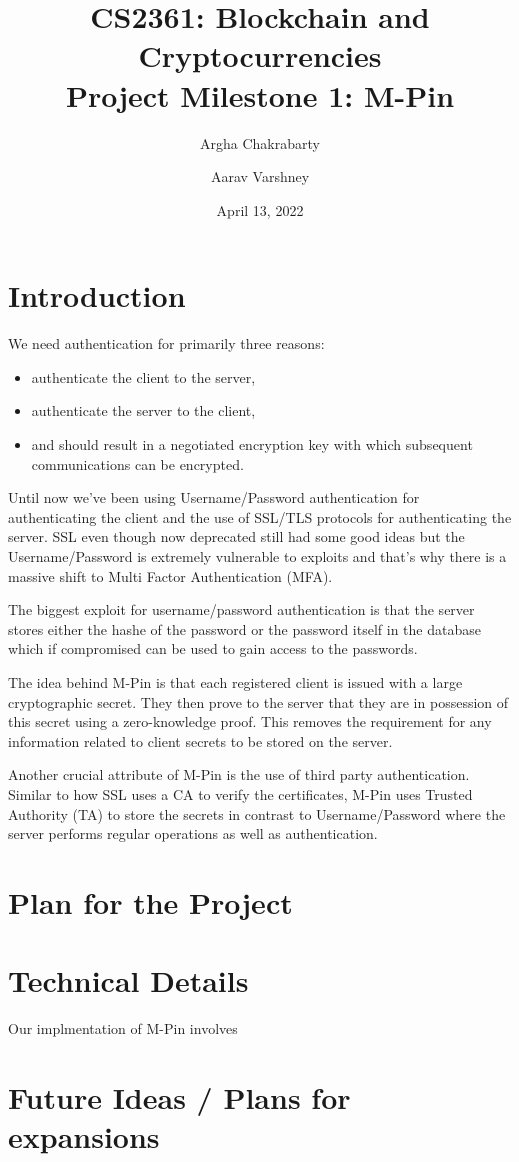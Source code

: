 \documentclass[]{article}   %
\begin{document}
\title{CS2361: Blockchain and Cryptocurrencies\\ Project Milestone 1: M-Pin}   %
\author{Argha Chakrabarty \and Aarav Varshney}         %
\date{April 13, 2022}    %
\maketitle

\section*{Introduction}
We need authentication for primarily three reasons:
\begin{itemize}
    \item authenticate the client to the server,
    \item authenticate the server to the client, 
    \item and should result in a negotiated encryption key with which subsequent communications can be encrypted.
\end{itemize}
Until now we've been using Username/Password authentication for authenticating the client and the use of SSL/TLS protocols for authenticating the server. SSL even though now deprecated still had some good ideas but the Username/Password is extremely vulnerable to exploits and that's why there is a massive shift to Multi Factor Authentication (MFA). 

The biggest exploit for username/password authentication is that the server stores either the hashe of the password or the password itself in the database which if compromised can be used to gain access to the passwords. 

The idea behind M-Pin is that each registered client is issued with a large cryptographic secret. They then prove to the server that they are in possession of this secret using a zero-knowledge proof. This removes the requirement for any information related to client secrets to be stored on the server. 

Another crucial attribute of M-Pin is the use of third party authentication. Similar to how SSL uses a CA to verify the certificates, M-Pin uses Trusted Authority (TA) to store the secrets in contrast to Username/Password where the server performs regular operations as well as authentication. 
\newpage
\section*{Plan for the Project}
\newpage
\section*{Technical Details}
Our implmentation of M-Pin involves 
\newpage
\section*{Future Ideas / Plans for expansions}


\nocite{*}


\end{document}
